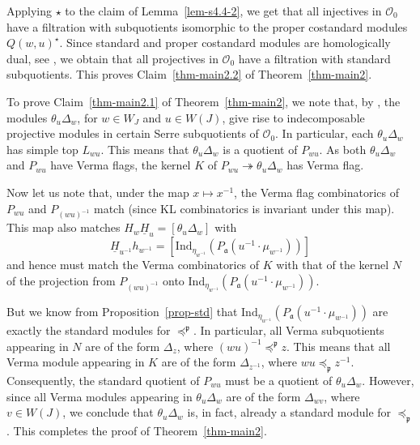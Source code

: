 \documentclass[a4paper]{amsart}
\newcommand{\tto}{\twoheadrightarrow}
\begin{document}
Applying $\star$ to the claim of Lemma~\ref{lem-s4.4-2}, we get 
that all injectives in $\mathcal{O}_0$ have a filtration
with subquotients isomorphic to the proper costandard modules 
$Q(w,u)^\star$. Since standard and proper costandard modules
are homologically dual, see \cite[Theorem~1]{Fr}, we obtain
that all projectives in $\mathcal{O}_0$ have a filtration
with standard subquotients. This proves Claim~\eqref{thm-main2.2}
of Theorem~\ref{thm-main2}.

To prove Claim~\eqref{thm-main2.1}
of Theorem~\ref{thm-main2}, we note that, by 
\cite[Theorem~37]{CMZ}, the modules 
$\theta_u\Delta_w$, for $w\in W_J$ and $u\in W(J)$, give rise
to indecomposable projective modules in certain Serre subquotients
of $\mathcal{O}_0$. In particular, each $\theta_u\Delta_w$ has
simple top $L_{wu}$. This means that $\theta_u\Delta_w$
is a quotient of $P_{wu}$. As both $\theta_u\Delta_w$
and $P_{wu}$ have Verma flags, the kernel $K$ of
$P_{wu}\tto \theta_u\Delta_w$ has Verma flag. 

Now let us note that, under the map $x\mapsto x^{-1}$, the
Verma flag combinatorics of $P_{wu}$ and $P_{(wu)^{-1}}$
match (since KL combinatorics is invariant under this map).
This map also matches $H_w\underline{H}_u=[\theta_u\Delta_w]$ with
\begin{displaymath}
\underline{H}_{u^{-1}}h_{w^{-1}}=
[\mathrm{Ind}_{\eta_{w^{-1}}}(P_\mathfrak{a}(u^{-1}\cdot \mu_{w^{-1}}))] 
\end{displaymath}
and hence must match the Verma combinatorics of $K$ with that of 
the kernel $N$ of the projection from $P_{(wu)^{-1}}$ onto
$\mathrm{Ind}_{\eta_{w^{-1}}}(P_\mathfrak{a}(u^{-1}\cdot \mu_{w^{-1}}))$.

But we know from Proposition~\ref{prop-std} that 
$\mathrm{Ind}_{\eta_{w^{-1}}}(P_\mathfrak{a}(u^{-1}\cdot \mu_{w^{-1}}))$
are exactly the standard modules for $\preceq^\mathfrak{p}$. 
In particular, all Verma subquotients appearing in $N$ are 
of the form $\Delta_z$, where $(wu)^{-1}\preceq^\mathfrak{p}z$.
This means that all Verma module appearing in $K$ are 
of the form $\Delta_{z^{-1}}$, where $wu\preceq_\mathfrak{p}z^{-1}$.
Consequently, the standard quotient of $P_{wu}$ must be a quotient
of $\theta_u\Delta_w$. However, since all Verma modules appearing in
$\theta_u\Delta_w$ are of the form $\Delta_{wv}$, where $v\in W(J)$,
we conclude that $\theta_u\Delta_w$ is, in fact, already 
a standard module for $\preceq_\mathfrak{p}$.
This completes the proof of Theorem~\ref{thm-main2}.
\end{document}
